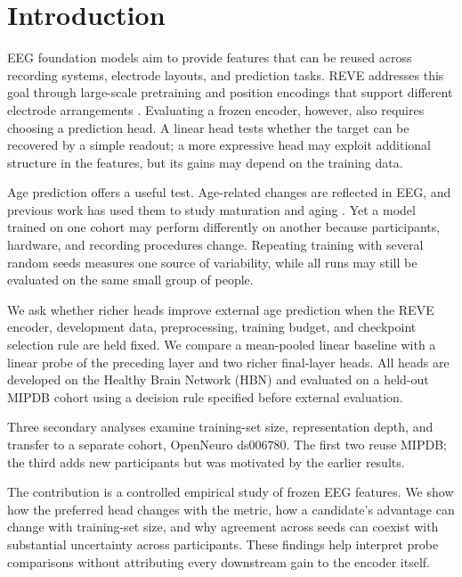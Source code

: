 \section{Introduction}

EEG foundation models aim to provide features that can be reused across
recording systems, electrode layouts, and prediction tasks. REVE addresses
this goal through large-scale pretraining and position encodings that support
different electrode arrangements \citep{elouahidi2025reve}. Evaluating a frozen
encoder, however, also requires choosing a prediction head. A linear head tests
whether the target can be recovered by a simple readout; a more expressive head
may exploit additional structure in the features, but its gains may depend on
the training data.

Age prediction offers a useful test. Age-related changes are reflected in EEG,
and previous work has used them to study maturation and aging
\citep{sun2019brainage,vandenbosch2019age}. Yet a model trained on one cohort may
perform differently on another because participants, hardware, and recording
procedures change. Repeating training with several random seeds measures one
source of variability, while all runs may still be evaluated on the same small
group of people.

We ask whether richer heads improve external age prediction when the REVE
encoder, development data, preprocessing, training budget, and checkpoint
selection rule are held fixed. We compare a mean-pooled linear baseline with a
linear probe of the preceding layer and two richer final-layer heads. All heads
are developed on the Healthy Brain Network (HBN) and evaluated on a held-out
MIPDB cohort using a decision rule specified before external evaluation.

Three secondary analyses examine training-set size, representation depth, and
transfer to a separate cohort, OpenNeuro ds006780. The first two reuse MIPDB;
the third adds new participants but was motivated by the earlier results.

The contribution is a controlled empirical study of frozen EEG features. We
show how the preferred head changes with the metric, how a candidate's
advantage can change with training-set size, and why agreement across seeds
can coexist with substantial uncertainty across participants. These findings
help interpret probe comparisons without attributing every downstream gain
to the encoder itself.
